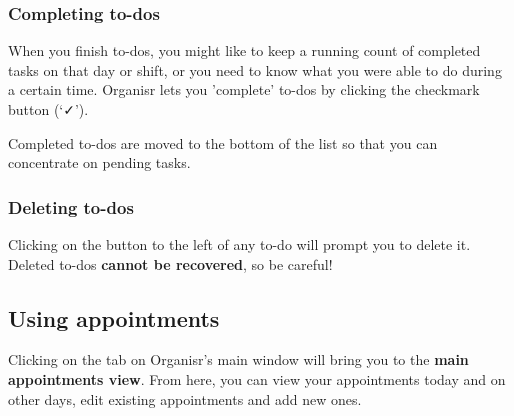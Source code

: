 \subsubsection{Completing to-dos}


When you finish to-dos, you might like to keep a running count of completed
tasks on that day or shift, or you need to know what you were able to do during
a certain time. Organisr lets you 'complete' to-dos by clicking the
checkmark button (`✓').

Completed to-dos are moved to the bottom of the list so that you can concentrate
on pending tasks.


\subsubsection{Deleting to-dos}


Clicking on the  button to the left of any to-do will prompt you to
delete it. Deleted to-dos \textbf{cannot be recovered}, so be careful!



\subsection{Using appointments}

Clicking on the  tab on Organisr's main window will bring
you to the \textbf{main appointments view}. From here, you can view your
appointments today and on other days, edit existing appointments and add new
ones.
